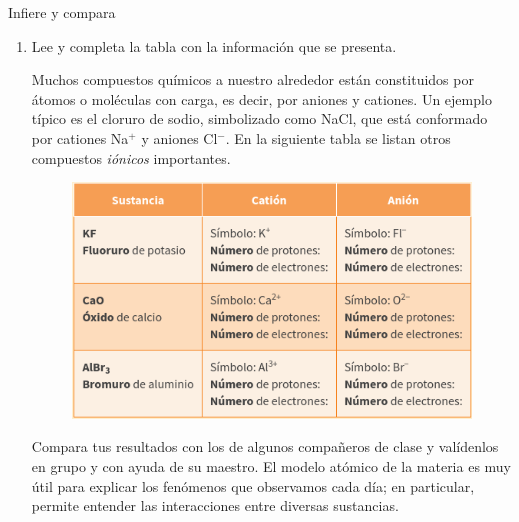 \documentclass[11pt]{book}
\begin{document}
\begin{boxK}
  Infiere y compara
  \begin{enumerate}
    \item Lee y completa la tabla con la información que se presenta.
          \begin{boxF}
            Muchos compuestos químicos a nuestro alrededor están constituidos por átomos o moléculas con carga, es decir,
            por aniones y cationes. Un ejemplo típico es el cloruro de sodio, simbolizado como NaCl, que está conformado por
            cationes Na$^+$ y aniones Cl$^-$. En la siguiente tabla se listan otros compuestos \emph{iónicos} importantes.
          \end{boxF}

          \begin{figure}[H]
            \centering
            \includegraphics[width=0.6\linewidth]{tablaAnionCation.png}
            \label{fig:tablaAnionCation}
          \end{figure}%

          Compara tus resultados con los de algunos compañeros de clase y valídenlos en grupo y con ayuda de su maestro.
          El modelo atómico de la materia es muy útil para explicar los fenómenos que observamos cada día; en particular, permite entender las interacciones entre diversas sustancias.
  \end{enumerate}
\end{boxK}
%
\end{document}
